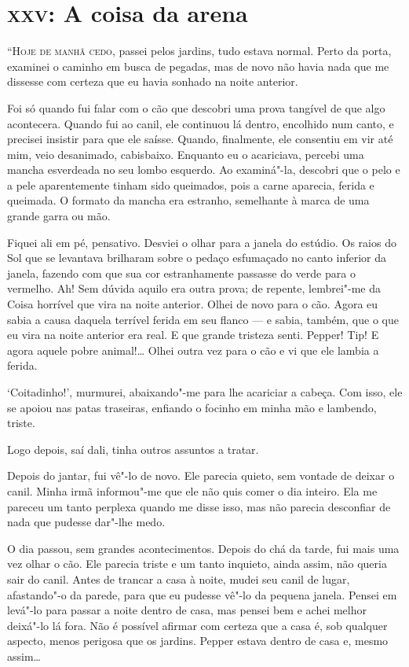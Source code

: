 \clearpage

\chapter{\textsc{xxv}:  A coisa da arena}

\textsc{“Hoje de manhã cedo,} passei pelos jardins, tudo estava normal. Perto da porta, examinei o caminho em busca de
pegadas, mas de novo não havia nada que me dissesse com certeza que eu havia sonhado na noite anterior.

Foi só quando fui falar com o cão que descobri uma prova tangível de que algo acontecera. Quando fui ao canil, ele
continuou lá dentro, encolhido num canto, e precisei insistir para que ele saísse. Quando, finalmente, ele consentiu em
vir até mim, veio desanimado, cabisbaixo. Enquanto eu o acariciava, percebi uma mancha esverdeada no seu lombo
esquerdo. Ao examiná"-la, descobri que o pelo e a pele aparentemente tinham sido queimados, pois a carne aparecia,
ferida e queimada. O formato da mancha era estranho, semelhante à marca de uma grande garra ou mão.

Fiquei ali em pé, pensativo. Desviei o olhar para a janela do estúdio. Os raios do Sol que se levantava brilharam sobre
o pedaço esfumaçado no canto inferior da janela, fazendo com que sua cor estranhamente passasse do verde para o
vermelho. Ah! Sem dúvida aquilo era outra prova; de repente, lembrei"-me da Coisa horrível que vira na noite
anterior. Olhei de novo para o cão. Agora eu sabia a causa daquela terrível ferida em seu flanco --- e sabia, também, que
o que eu vira na noite anterior era real. E que grande tristeza senti. Pepper! Tip! E agora aquele pobre animal!\ldots{} Olhei
outra vez para o cão e vi que ele lambia a ferida.

‘Coitadinho!’, murmurei, abaixando"-me para lhe acariciar a cabeça. Com isso, ele se apoiou nas patas traseiras,
enfiando o focinho em minha mão e lambendo, triste.

Logo depois, saí dali, tinha outros assuntos a tratar.

Depois do jantar, fui vê"-lo de novo. Ele parecia quieto, sem vontade de deixar o canil. Minha irmã informou"-me que
ele não quis comer o dia inteiro. Ela me pareceu um tanto perplexa quando me disse isso, mas não parecia desconfiar de
nada que pudesse dar"-lhe medo.

O dia passou, sem grandes acontecimentos. Depois do chá da tarde, fui mais uma vez olhar o cão. Ele parecia triste e um
tanto inquieto, ainda assim, não queria sair do canil. Antes de trancar a casa à noite, mudei seu canil de lugar,
afastando"-o da parede, para que eu pudesse vê"-lo da pequena janela. Pensei em levá"-lo para passar a noite dentro de
casa, mas pensei bem e achei melhor deixá"-lo lá fora. Não é possível afirmar com certeza que a casa é, sob qualquer
aspecto, menos perigosa que os jardins. Pepper estava dentro de casa e, mesmo assim\ldots{}

